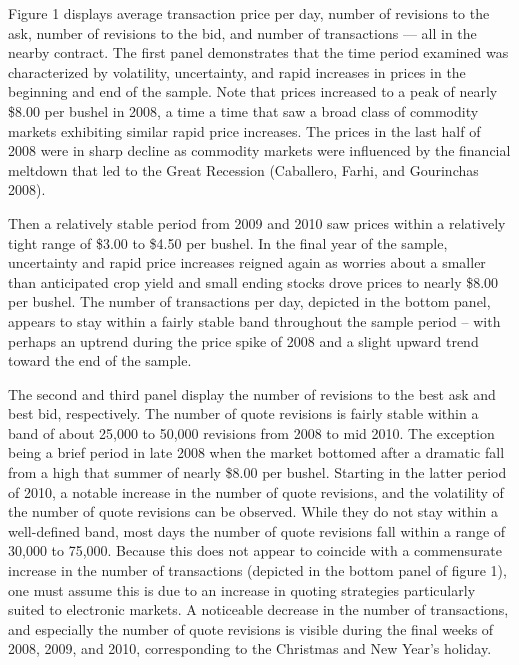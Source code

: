 \documentclass[review,12pt]{elsarticle}
\begin{document}
Figure 1 displays average transaction price per day, number of revisions
to the ask, number of revisions to the bid, and number of transactions
--- all in the nearby contract. The first panel demonstrates that the
time period examined was characterized by volatility, uncertainty, and
rapid increases in prices in the beginning and end of the sample. Note
that prices increased to a peak of nearly \$8.00 per bushel in 2008, a
time a time that saw a broad class of commodity markets exhibiting
similar rapid price increases. The prices in the last half of 2008 were
in sharp decline as commodity markets were influenced by the financial
meltdown that led to the Great Recession (Caballero, Farhi, and
Gourinchas 2008).

Then a relatively stable period from 2009 and 2010 saw prices within a
relatively tight range of \$3.00 to \$4.50 per bushel. In the final year
of the sample, uncertainty and rapid price increases reigned again as
worries about a smaller than anticipated crop yield and small ending
stocks drove prices to nearly \$8.00 per bushel. The number of
transactions per day, depicted in the bottom panel, appears to stay
within a fairly stable band throughout the sample period -- with perhaps
an uptrend during the price spike of 2008 and a slight upward trend
toward the end of the sample.

The second and third panel display the number of revisions to the best
ask and best bid, respectively. The number of quote revisions is fairly
stable within a band of about 25,000 to 50,000 revisions from 2008 to
mid 2010. The exception being a brief period in late 2008 when the
market bottomed after a dramatic fall from a high that summer of nearly
\$8.00 per bushel. Starting in the latter period of 2010, a notable
increase in the number of quote revisions, and the volatility of the
number of quote revisions can be observed. While they do not stay within
a well-defined band, most days the number of quote revisions fall within
a range of 30,000 to 75,000. Because this does not appear to coincide
with a commensurate increase in the number of transactions (depicted in
the bottom panel of figure 1), one must assume this is due to an
increase in quoting strategies particularly suited to electronic
markets. A noticeable decrease in the number of transactions, and
especially the number of quote revisions is visible during the final
weeks of 2008, 2009, and 2010, corresponding to the Christmas and New
Year's holiday.
\end{document}
